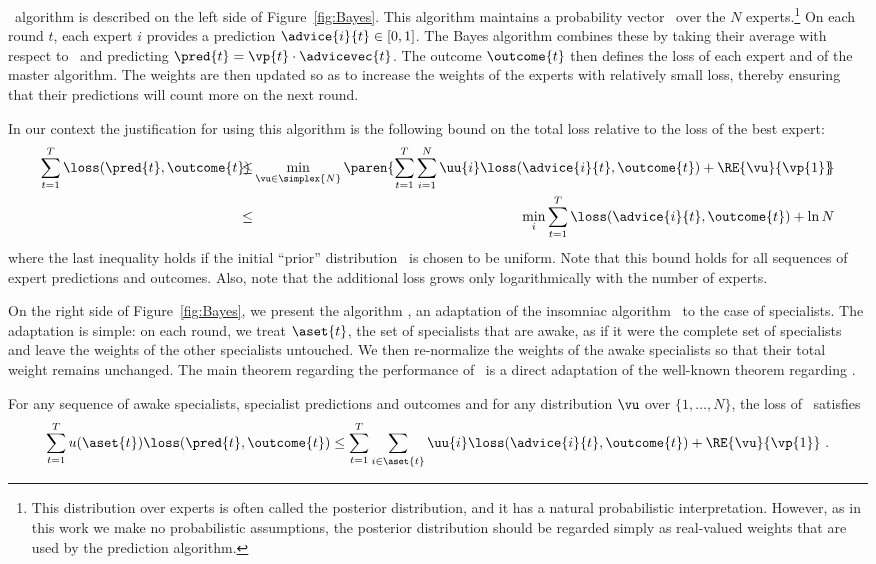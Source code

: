 \Bayes\ algorithm is
described on the left side of Figure~\ref{fig:Bayes}.  
This algorithm maintains a probability vector \ over
the $N$ experts.\footnote{This distribution over experts is often
called the posterior distribution, and it has a natural probabilistic
interpretation. However, as in this work we make no probabilistic 
assumptions, the posterior distribution should be regarded simply
as real-valued weights that are used by the prediction
algorithm.}
On each round $t$, each expert $i$ provides a prediction
$\advice{i}{t}\in[0,1]$.
The Bayes algorithm combines these by taking their average with
respect to \ and predicting $\pred{t}=\vp{t}\cdot\advicevec{t}$.
The outcome $\outcome{t}$ then defines the loss of each expert and of
the master algorithm.
The weights are then updated so as to increase the weights of the
experts with relatively small loss, thereby ensuring that their
predictions will count more on the next round.

In our context the justification for using this algorithm is
the following bound on the total loss relative to the loss of the best
expert:
\begin{eqnarray} \label{eqn:Bayes}
\sum_{t=1}^T \loss(\pred{t},\outcome{t})
\!\!\!\!\! & \leq &  \!\!\!\!\!
\min_{\vu\in\simplex{N}} \paren{
\sum_{t=1}^T 
 \sum_{i=1}^N \uu{i} \loss(\advice{i}{t},\outcome{t})
+
\RE{\vu}{\vp{1}}
\!\!} \nonumber \\
\!\!\!\!\! & \leq &  \!\!\!\!\!
\min_i
\sum_{t=1}^T 
  \loss(\advice{i}{t},\outcome{t})
+
\ln N
\end{eqnarray}
where the last inequality holds if the initial ``prior'' distribution
\ is chosen to be uniform.
Note that this bound holds for all sequences of expert predictions and
outcomes.
Also, note that the additional loss grows only logarithmically with
the number of experts.

On the right side of Figure~\ref{fig:Bayes}, we present the
algorithm \SBayes, an adaptation of the insomniac algorithm
\Bayes\ to the case of specialists. The adaptation is simple: on each
round,
we treat $\aset{t}$, the set of specialists that are awake, as if it
were the complete set of specialists and leave the weights of the
other specialists untouched. We then re-normalize the weights of the
awake specialists so that their total weight remains unchanged.  The
main theorem regarding the performance of \SBayes\ is a direct
adaptation of the well-known theorem regarding \Bayes.

\begin{theorem} \label{thm:SBayes}
For any sequence of 
awake specialists, specialist predictions and outcomes
and for any distribution $\vu$ over $\{1,\ldots, N\}$, the loss of
\SBayes\ satisfies
\[
 \sum_{t=1}^T u(\aset{t}) \loss(\pred{t},\outcome{t})
\leq
 \sum_{t=1}^T 
  \sum_{i \in \aset{t}} \uu{i} \loss(\advice{i}{t},\outcome{t})
+
  \RE{\vu}{\vp{1}}~.
\]
\end{theorem}

